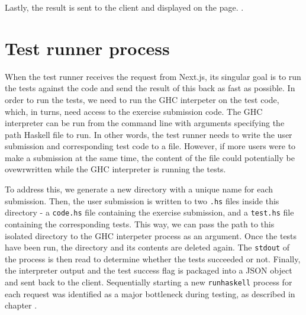 Lastly, the result is sent to the client and displayed on the page.
.

\section{Test runner process} \label{sec:test_runner_process}
When the test runner receives the request from Next.js, its singular goal is to run the tests against the code and send the result of this back as fast as possible.
In order to run the tests, we need to run the GHC interpeter on the test code, which, in turns, need access to the exercise submission code.
The GHC interpreter can be run from the command line with arguments specifying the path Haskell file to run.
In other words, the test runner needs to write the user submission and corresponding test code to a file.
However, if more users were to make a submission at the same time, the content of the file could potentially be ovewrwritten while the GHC interpreter is running the tests.

To address this, we generate a new directory with a unique name for each submission.
Then, the user submission is written to two  \texttt{.hs} files inside this directory - a \texttt{code.hs} file containing the exercise submission, and a \texttt{test.hs} file containing the corresponding tests.
This way, we can pass the path to this isolated directory to the GHC interpeter process as an argument.
Once the tests have been run, the directory and its contents are deleted again.
The \texttt{stdout} of the process is then read to determine whether the tests succeeded or not.
Finally, the interpreter output and the test success flag is packaged into a JSON object and sent back to the client.
Sequentially starting a new \texttt{runhaskell} process for each request was identified as a major bottleneck during testing, as described in chapter .



